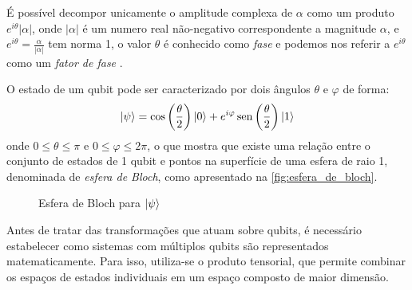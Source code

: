 É possível decompor unicamente o amplitude complexa de $\alpha$ como um produto $e^{i\theta}|\alpha|$, onde $|\alpha|$ é um numero real não-negativo correspondente a magnitude $\alpha$, e $e^{i\theta}=\frac{\alpha}{|\alpha|}$ tem norma 1, o valor $\theta$ é conhecido como \textit{fase} e podemos nos referir a $e^{i\theta}$ como um \textit{fator de fase} \cite{Rieffel2000}.

O estado de um qubit pode ser caracterizado por dois ângulos $\theta$ e $\varphi$ de forma:
$$
    \label{eq:ket_psi}
    \ket{\psi}=\cos\left(\dfrac{\theta}{2}\right)\ket{0}+e^{i\varphi}\operatorname{sen}\left(\dfrac{\theta}{2}\right)\ket{1}
$$
onde $0\leq\theta\leq\pi$ e $0\leq\varphi\leq2\pi$, o que mostra que existe uma relação entre o conjunto de estados de 1 qubit e pontos na superfície de uma esfera de raio 1, denominada de \textit{esfera de Bloch}, como apresentado na \autoref{fig:esfera_de_bloch}.
    

\begin{figure}[htbp]
    \centering
    \caption{Esfera de Bloch para $\ket{\psi}$}    
    \label{fig:esfera_de_bloch}
\end{figure}

Antes de tratar das transformações que atuam sobre qubits, é necessário estabelecer como sistemas com múltiplos qubits são representados matematicamente. Para isso, utiliza-se o produto tensorial, que permite combinar os espaços de estados individuais em um espaço composto de maior dimensão.


